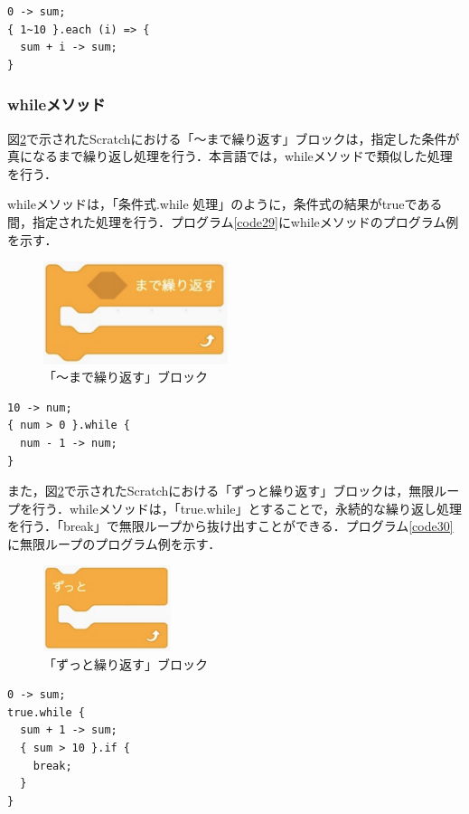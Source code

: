 \documentclass[10pt,a4j]{ltjsarticle}
\begin{document}
\begin{lstlisting}[caption=eachメソッドのプログラム例, label=code28]
0 -> sum;
{ 1~10 }.each (i) => {
  sum + i -> sum;
}
\end{lstlisting}
\subsubsection{whileメソッド}
図\ref{fig:while}で示されたScratchにおける「〜まで繰り返す」ブロックは，指定した条件が真になるまで繰り返し処理を行う．本言語では，whileメソッドで類似した処理を行う．

whileメソッドは，「条件式.while 処理」のように，条件式の結果がtrueである間，指定された処理を行う．プログラム\ref{code29}にwhileメソッドのプログラム例を示す．

\begin{figure}[H]
  \centering
  \includegraphics[height=30mm]{images/while.pdf} 
  \caption{「〜まで繰り返す」ブロック}
  \label{fig:while}
\end{figure}

\begin{lstlisting}[caption=whileメソッドのプログラム例, label=code29]
10 -> num;
{ num > 0 }.while {
  num - 1 -> num;
}
\end{lstlisting}

また，図\ref{fig:while}で示されたScratchにおける「ずっと繰り返す」ブロックは，無限ループを行う．whileメソッドは，「true.while」とすることで，永続的な繰り返し処理を行う．「break」で無限ループから抜け出すことができる．プログラム\ref{code30}に無限ループのプログラム例を示す．

\begin{figure}[H]
  \centering
  \includegraphics[height=25mm]{images/truewhile.pdf} 
  \caption{「ずっと繰り返す」ブロック}
  \label{fig:while}
\end{figure}

\begin{lstlisting}[caption=無限ループのプログラム例, label=code30]
0 -> sum;
true.while {
  sum + 1 -> sum;
  { sum > 10 }.if {
    break;
  }
}
\end{lstlisting}
\end{document}
